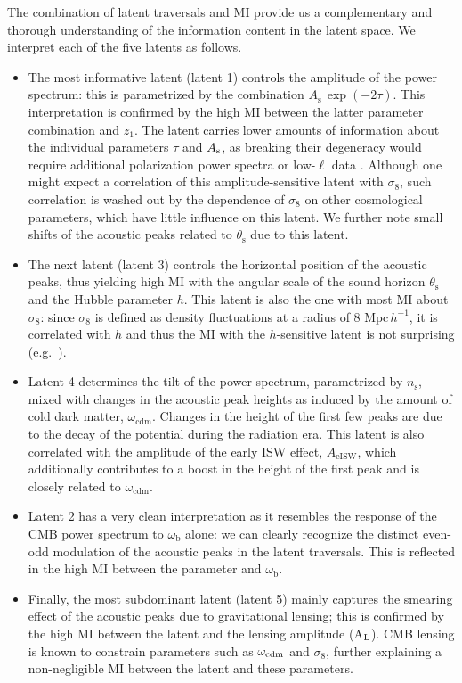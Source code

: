 \documentclass[aps, prd, reprint, superscriptaddress, nofootinbib, bibnotes]{revtex4-2}
\begin{document}
The combination of latent traversals and MI provide us a complementary and thorough understanding of the information content in the latent space. We interpret each of the five latents as follows.

\begin{itemize}
    \item The most informative latent (latent 1) controls the amplitude of the power spectrum: this is parametrized by the combination $A_\mathrm{s}\, \exp({-2\tau})$. This interpretation is confirmed by the high MI between the latter parameter combination and $z_1$. The latent carries lower amounts of information about the individual parameters $\tau$ and $A_{\rm{s}}$, as breaking their degeneracy would require additional polarization power spectra or low-$\ell$ data \cite{Planck:2019nip}.
    Although one might expect a correlation of this amplitude-sensitive latent with $\sigma_{8}$, such correlation is washed out by the dependence of $\sigma_{8}$ on other cosmological parameters, which have little influence on this latent.
    We further note small shifts of the acoustic peaks related to $\theta_\mathrm{s}$ due to this latent.
    
    \item The next latent (latent 3) controls the horizontal position of the acoustic peaks, thus yielding high MI with the angular scale of the sound horizon $\theta_\mathrm{s}$ and the Hubble parameter $h$. This latent is also the one with most MI about $\sigma_8$: since $\sigma_8$ is defined as density fluctuations at a radius of 8 $\textrm{Mpc}\, h^{-1}$, it is correlated with $h$ and thus the MI with the $h$-sensitive latent is not surprising (e.g.\ \cite{Sanchez:2020vvb, Forconi:2025cwp}).
    \item Latent 4 determines the tilt of the power spectrum, parametrized by $n_\mathrm{s}$, mixed with changes in the acoustic peak heights as induced by the amount of cold dark matter, $\omega_\mathrm{cdm}$. Changes in the height of the first few peaks are due to the decay of the potential during the radiation era. This latent is also correlated with the amplitude of the early ISW effect, $A_\mathrm{eISW}$, which additionally contributes to a boost in the height of the first peak and is closely related to $\omega_\mathrm{cdm}$.
    \item Latent 2 has a very clean interpretation as it resembles the response of the CMB power spectrum to $\omega_\mathrm{b}$ alone: we can clearly recognize the distinct even-odd modulation of the acoustic peaks in the latent traversals. This is reflected in the high MI between the parameter and $\omega_\mathrm{b}$. 
    \item Finally, the most subdominant latent (latent 5) mainly captures the smearing effect of the acoustic peaks due to gravitational lensing; this is confirmed by the high MI between the latent and the lensing amplitude (A$_{\rm L}$). CMB lensing is known to constrain parameters such as $\omega_{\rm cdm}$ and $\sigma_{8}$, further explaining a non-negligible MI between the latent and these parameters.
\end{itemize}
\end{document}
